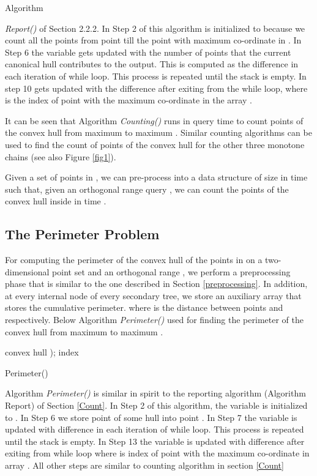 \documentclass[runningheads,a4paper]{llncs}
\begin{document}
Algorithm {\emph{Report()} of Section 2.2.2. In
Step 2 of this algorithm  is initialized to  because we count all the
points from point  till the point with maximum  co-ordinate in . In Step
6 the variable  gets updated with the number of points that the current
canonical hull contributes to the output. This is computed as the difference
 in each iteration of while loop. This process is repeated until the
stack  is empty.  In step 10  gets updated with the difference
 after exiting from the while loop, where 
is the index of point with the maximum  co-ordinate in the array .

It can be seen that Algorithm \emph{Counting()} runs in  query time to count points of the convex hull 
from maximum  to maximum . Similar counting algorithms can be used to
find the count of points of the convex hull  for the other three
monotone chains (see also Figure \ref{fig1}).
\begin{theorem}
Given a set  of  points in , we can pre-process 
into a data structure of size  in time 
such that, given an orthogonal range query , we can count the points of the convex hull inside  in time .
\end{theorem}

\subsection{The Perimeter Problem}
For computing the perimeter of the convex hull of the points in  on a
two-dimensional point set  and an orthogonal range , we perform a
preprocessing phase that is similar to the one described in Section
\ref{preprocessing}. In addition, at every internal node  of every
secondary tree, we store an auxiliary array  that stores the cumulative perimeter.
 where
 is the distance between points  and 
respectively.  Below Algorithm  {\em Perimeter()} used for finding the perimeter of the convex
hull  from maximum  to maximum .
\vspace{-0.7cm}
\begin{algorithm}
 \KwData{,}
  convex hull );
  index \;
   \;
  \;
  \caption{Perimeter()}
\end{algorithm}
\vspace{-0.7cm}
Algorithm {\em Perimeter()} is similar in spirit to the reporting
algorithm (Algorithm Report) of Section \ref{Count}.
In Step 2 of this algorithm, the variable  is initialized to
. In Step 6 we store point  of some hull  into point .  In
Step 7 the variable  is updated with difference 
in each iteration of while loop. This process is repeated until the stack 
is empty.
In Step 13 the variable  is updated with difference
 after exiting from while loop where
 is index of point with the maximum  co-ordinate in array
. All other steps are similar to counting algorithm in section \ref{Count}

}
\end{document}
